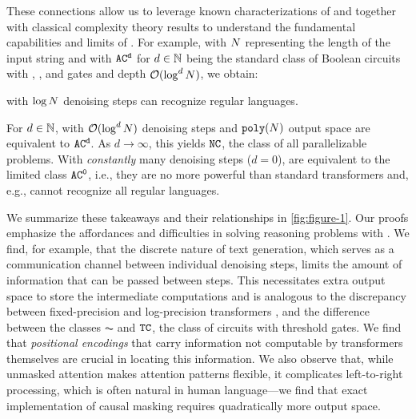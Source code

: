\documentclass{article} %
\begin{document}
These connections allow us to leverage known characterizations of \CoTAcr and \LTsAcr together with classical complexity theory results to understand the fundamental capabilities and limits of \MDMsAcr \citep{li2024chain,saunshi2025reasoninglatentthoughtspower,london2025pausetokensstrictlyincrease,svete2025exactexpressivepowerfiniteprecision}.
For example, with ${{N}}$ representing the length of the input string and with ${{{{{{\mathtt{AC}}}^{\mathtt{d}}}}}}$ for $d \in {{\mathbb{N}}}$ being the standard class of Boolean circuits with \andGate, \orGate, and \notGate gates and depth ${{\mathcal{O}}}(\log^d{{N}})$, we obtain:
\begin{takeaway} \label{takeaway:takeaway-4}
   \MDMsAcr with $\log{{N}}$ denoising steps can recognize regular languages.
\end{takeaway}
\begin{takeaway} \label{takeaway:takeaway-5}
   For $d \in {{\mathbb{N}}}$, \MDMsAcr with ${{\mathcal{O}}}(\log^d{{N}})$ denoising steps and $\polyFun{\strlen}$ output space are equivalent to ${{{{{{\mathtt{AC}}}^{\mathtt{d}}}}}}$.
   As $d \to \infty$, this yields ${{\mathtt{NC}}}$, the class of all parallelizable problems.
   With \emph{constantly} many denoising steps ($d = 0$), \MDMsAcr are equivalent to the limited class ${{{{{{\mathtt{AC}}}^{\mathtt{0}}}}}}$, i.e., they are no more powerful than standard transformers and, e.g., cannot recognize all regular languages.
\end{takeaway}
We summarize these takeaways and their relationships in \cref{fig:figure-1}.
Our proofs emphasize the affordances and difficulties in solving reasoning problems with \MDMsAcr. 
We find, for example, that the discrete nature of text generation, which serves as a communication channel between individual denoising steps, limits the amount of information that can be passed between steps.
This necessitates extra output space to store the intermediate computations and is analogous to the discrepancy between fixed-precision and log-precision transformers \citep{li2024chain}, and the difference between the classes $\AC$ and ${{\mathtt{TC}}}$, the class of circuits with threshold gates.
We find that \emph{positional encodings} that carry information not computable by transformers themselves are crucial in locating this information.
We also observe that, while unmasked attention makes \MDMAcr attention patterns flexible, it complicates left-to-right processing, which is often natural in human language---we find that exact implementation of causal masking requires quadratically more output space.
\end{document}
